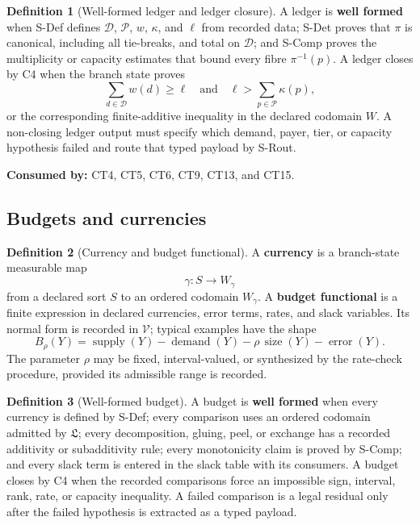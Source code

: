 \documentclass[
  11pt,
]{article}
\theoremstyle{definition}
\newtheorem{definition}{Definition}[section]
\begin{document}
\begin{definition}[Well-formed ledger and ledger closure]\label{def:ledger-closure}
A ledger is \textbf{well formed} when S-Def defines
\(\mathcal D\), \(\mathcal P\), \(w\), \(\kappa\), and \(\ell\) from
recorded data; S-Det proves that \(\pi\) is canonical, including all
tie-breaks, and total on \(\mathcal D\); and S-Comp proves the
multiplicity or capacity estimates that bound every fibre
\(\pi^{-1}(p)\).  A ledger closes by C4 when the
branch state proves
\[
\sum_{d\in\mathcal D} w(d)\ge \ell
\quad\text{and}\quad
\ell>\sum_{p\in\mathcal P}\kappa(p),
\]
or the corresponding finite-additive inequality in the declared
codomain \(W\).  A non-closing ledger output must specify which demand,
payer, tier, or capacity hypothesis failed and route that typed payload
by S-Rout.
\end{definition}

\noindent\textbf{Consumed by:} CT4, CT5, CT6, CT9, CT13, and CT15.

\subsection{Budgets and currencies}\label{data-budgets}
\begin{definition}[Currency and budget functional]\label{def:budget-functional}
A \textbf{currency} is a branch-state measurable map
\[
\gamma:S\longrightarrow W_\gamma
\]
from a declared sort \(S\) to an ordered codomain \(W_\gamma\).  A
\textbf{budget functional} is a finite expression in declared
currencies, error terms, rates, and slack variables.  Its normal form is
recorded in \(\mathcal V\); typical examples have the shape
\[
B_\rho(Y)
=\operatorname{supply}(Y)-\operatorname{demand}(Y)-\rho\,\operatorname{size}(Y)
-\operatorname{error}(Y).
\]
The parameter \(\rho\) may be fixed, interval-valued, or synthesized by
the rate-check procedure, provided its admissible range is recorded.
\end{definition}

\begin{definition}[Well-formed budget]\label{def:well-formed-budget}
A budget is \textbf{well formed} when every currency is defined by
S-Def; every comparison uses an ordered codomain admitted by
\(\mathfrak L\); every decomposition, gluing, peel, or exchange has a
recorded additivity or subadditivity rule; every monotonicity claim is
proved by S-Comp; and every slack term is entered in the slack table
with its consumers.  A budget closes by C4 when the recorded
comparisons force an impossible sign, interval, rank, rate, or capacity
inequality.  A failed comparison is a legal residual only after the
failed hypothesis is extracted as a typed payload.
\end{definition}
\end{document}
